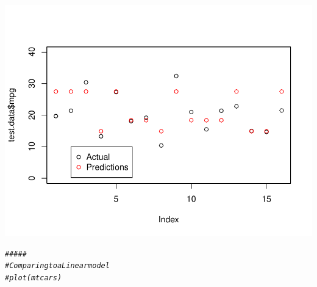 \documentclass{article}\usepackage[]{graphicx}\usepackage[]{color}
\makeatletter
\def\maxwidth{ %
  \ifdim\Gin@nat@width>\linewidth
    \linewidth
  \else
    \Gin@nat@width
  \fi
}
\newcommand{\hlcom}[1]{\textcolor[rgb]{0.678,0.584,0.686}{\textit{#1}}}%
\newenvironment{kframe}{%
 \def\at@end@of@kframe{}%
 \ifinner\ifhmode%
  \def\at@end@of@kframe{\end{minipage}}%
  \begin{minipage}{\columnwidth}%
 \fi\fi%
 \def\FrameCommand##1{\hskip\@totalleftmargin \hskip-\fboxsep
 \colorbox{shadecolor}{##1}\hskip-\fboxsep
     \hskip-\linewidth \hskip-\@totalleftmargin \hskip\columnwidth}%
 \MakeFramed {\advance\hsize-\width
   \@totalleftmargin\z@ \linewidth\hsize
   \@setminipage}}%
 {\par\unskip\endMakeFramed%
 \at@end@of@kframe}
\newenvironment{knitrout}{}{} %
\makeatother
\begin{document}
\begin{knitrout}
\includegraphics[width=\maxwidth]{figure/unnamed-chunk-2-3} 
\begin{kframe}\begin{alltt}
\hlcom{#####}
\hlcom{# Comparing to a Linear model }
\hlcom{#plot(mtcars)}


\end{alltt}
\end{kframe}
\end{knitrout}
\end{document}
